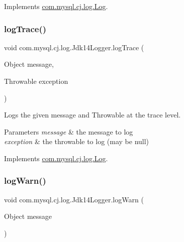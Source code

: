 Implements \mbox{\hyperlink{interfacecom_1_1mysql_1_1cj_1_1log_1_1_log_a04f51d4b9464df28c94695ae8159440e}{com.\+mysql.\+cj.\+log.\+Log}}.

\mbox{\label{classcom_1_1mysql_1_1cj_1_1log_1_1_jdk14_logger_a294191637fa5aadb2991b412b1fadde8}} 
\subsubsection{\texorpdfstring{log\+Trace()}{logTrace()}\hspace{0.1cm}{\footnotesize\ttfamily [2/2]}}
{\footnotesize\ttfamily void com.\+mysql.\+cj.\+log.\+Jdk14\+Logger.\+log\+Trace (\begin{DoxyParamCaption}\item[{Object}]{message,  }\item[{Throwable}]{exception }\end{DoxyParamCaption})}

Logs the given message and Throwable at the \textquotesingle{}trace\textquotesingle{} level.


\begin{DoxyParams}{Parameters}
{\em message} & the message to log \\
\hline
{\em exception} & the throwable to log (may be null) \\
\hline
\end{DoxyParams}


Implements \mbox{\hyperlink{interfacecom_1_1mysql_1_1cj_1_1log_1_1_log_aa93fa5550a3152afd64479adca676200}{com.\+mysql.\+cj.\+log.\+Log}}.

\mbox{\label{classcom_1_1mysql_1_1cj_1_1log_1_1_jdk14_logger_ae7bb8949ce0f06e610b7c2f285432ffd}} 
\subsubsection{\texorpdfstring{log\+Warn()}{logWarn()}\hspace{0.1cm}{\footnotesize\ttfamily [1/2]}}
{\footnotesize\ttfamily void com.\+mysql.\+cj.\+log.\+Jdk14\+Logger.\+log\+Warn (\begin{DoxyParamCaption}\item[{Object}]{message }\end{DoxyParamCaption})}

